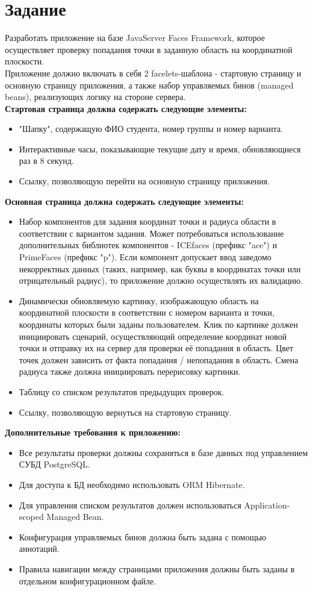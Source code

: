 \documentclass[12pt,a4paper]{report}
\begin{document}
\section*{Задание}
Разработать приложение на базе JavaServer Faces Framework, которое осуществляет проверку попадания точки в заданную область на координатной плоскости.\\
\hfill\break
Приложение должно включать в себя 2 facelets-шаблона - стартовую страницу и основную страницу приложения, а также набор управляемых бинов (managed beans), реализующих логику на стороне сервера.\\
\hfill\break
\textbf{Стартовая страница должна содержать следующие элементы:}
\begin{itemize}
    \item "Шапку", содержащую ФИО студента, номер группы и номер варианта.
    \item Интерактивные часы, показывающие текущие дату и время, обновляющиеся раз в 8 секунд.
    \item Ссылку, позволяющую перейти на основную страницу приложения.
\end{itemize}
\textbf{Основная страница должна содержать следующие элементы:}
\begin{itemize}
    \item Набор компонентов для задания координат точки и радиуса области в соответствии с вариантом задания. Может потребоваться использование дополнительных библиотек компонентов - ICEfaces (префикс "ace") и PrimeFaces (префикс "p"). Если компонент допускает ввод заведомо некорректных данных (таких, например, как буквы в координатах точки или отрицательный радиус), то приложение должно осуществлять их валидацию.
    \item Динамически обновляемую картинку, изображающую область на координатной плоскости в соответствии с номером варианта и точки, координаты которых были заданы пользователем. Клик по картинке должен инициировать сценарий, осуществляющий определение координат новой точки и отправку их на сервер для проверки её попадания в область. Цвет точек должен зависить от факта попадания / непопадания в область. Смена радиуса также должна инициировать перерисовку картинки.
    \item Таблицу со списком результатов предыдущих проверок.
    \item Ссылку, позволяющую вернуться на стартовую страницу.
\end{itemize}
\textbf{Дополнительные требования к приложению:}
\begin{itemize}
    \item Все результаты проверки должны сохраняться в базе данных под управлением СУБД PostgreSQL.
    \item Для доступа к БД необходимо использовать ORM Hibernate.
    \item Для управления списком результатов должен использоваться Application-scoped Managed Bean.
    \item Конфигурация управляемых бинов должна быть задана с помощью аннотаций.
    \item Правила навигации между страницами приложения должны быть заданы в отдельном конфигурационном файле.
\end{itemize}
\end{document}

